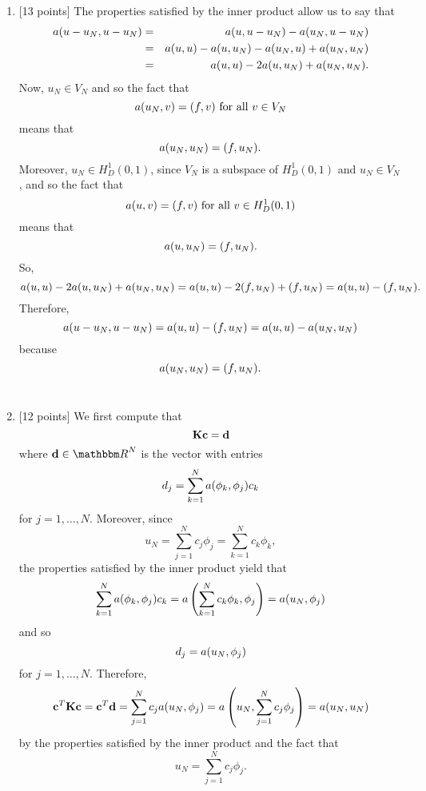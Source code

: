 \begin{solution}
\begin{enumerate}
\item {[13 points]} The properties satisfied by the inner product allow us to say that
\begin{eqnarray*}
a(u-u_N,u-u_N)&=&a(u,u-u_N)-a(u_N,u-u_N)
\\
&=&a(u,u)-a(u,u_N)-a(u_N,u)+a(u_N,u_N)
\\
&=&a(u,u)-2a(u,u_N)+a(u_N,u_N).
\end{eqnarray*}
Now, $u_N\in V_N$ and so the fact that
\[
a(u_N,v)=(f,v)\mbox{ for all }v\in V_N
\]
means that
\[
a(u_N,u_N)=(f,u_N).
\]
Moreover, $u_N\in H^1_D(0,1)$, since $V_N$ is a subspace of $H^1_D(0,1)$ and $u_N\in V_N$, and so the fact that
\[
a(u,v)=(f,v)\mbox{ for all }v\in H^1_D(0,1)
\]
means that
\[
a(u,u_N)=(f,u_N).
\]
So,
\[
a(u,u)-2a(u,u_N)+a(u_N,u_N)=a(u,u)-2(f,u_N)+(f,u_N)=a(u,u)-(f,u_N).
\]
Therefore,
\[
a(u-u_N,u-u_N)=a(u,u)-(f,u_N)=a(u,u)-a(u_N,u_N)
\]
because
\[
a(u_N,u_N)=(f,u_N).
\]
\\
\item {[12 points]} We first compute that
\[
{\bf K}{\bf c}={\bf d}
\]
where $\Bd\in\R^{N}$ is the vector with entries
\[
d_j=\sum_{k=1}^Na(\phi_k,\phi_j)c_k
\]
for $j=1,\ldots,N$. Moreover, since
\[
u_N=\sum_{j=1}^Nc_j\phi_j=\sum_{k=1}^Nc_k\phi_k,
\]
the properties satisfied by the inner product yield that
\[
\sum_{k=1}^Na(\phi_k,\phi_j)c_k=a\left(\sum_{k=1}^Nc_k\phi_k,\phi_j\right)=a(u_N,\phi_j)
\]
and so
\[
d_j=a(u_N,\phi_j)
\]
for $j=1,\ldots,N$. Therefore,
\[
{\bf c}^T{\bf K}{\bf c}={\bf c}^T{\bf d}=\sum_{j=1}^Nc_ja(u_N,\phi_j)=a\left(u_N,\sum_{j=1}^Nc_j\phi_j\right)=a(u_N,u_N)
\]
by the properties satisfied by the inner product and the fact that
\[
u_N=\sum_{j=1}^Nc_j\phi_j.
\]
\end{enumerate}
\end{solution}